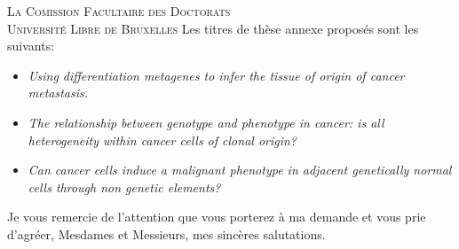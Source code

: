 \documentclass[12pt,origdate,origdate]{lettre}
\begin{document}
\begin{letter} {\textsc{La Comission Facultaire des Doctorats} \\
    \textsc{Université Libre de Bruxelles}}
Les titres de thèse annexe proposés sont les suivants:

\begin{itemize}
\item \emph{Using differentiation metagenes to infer the tissue of origin of
    cancer metastasis.}
\item \emph{The relationship between genotype and phenotype in cancer: is all
  heterogeneity within cancer cells of clonal origin?}
\item \emph{Can cancer cells induce a malignant phenotype in adjacent
    genetically normal cells through non genetic elements?}
\end{itemize}

\closing{Je vous remercie de l'attention que vous porterez \`{a} ma demande
  et vous prie d'agr\'eer, Mesdames et Messieurs, mes sinc\`eres salutations.}

\end{letter}
\end{document}
